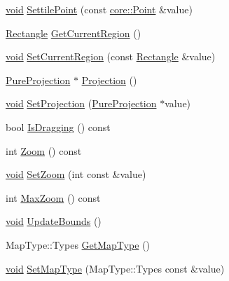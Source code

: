 \begin{DoxyCompactItemize}
\item 
\hyperlink{group___u_a_v_objects_plugin_ga444cf2ff3f0ecbe028adce838d373f5c}{void} \hyperlink{group___o_p_map_widget_ga9d04a0fb020c49a8280b7368f41594a2}{\-Settile\-Point} (const \hyperlink{structcore_1_1_point}{core\-::\-Point} \&value)
\item 
\hyperlink{structinternals_1_1_rectangle}{\-Rectangle} \hyperlink{group___o_p_map_widget_ga00bfe5203c4a1a950f4699bf6fe59293}{\-Get\-Current\-Region} ()
\item 
\hyperlink{group___u_a_v_objects_plugin_ga444cf2ff3f0ecbe028adce838d373f5c}{void} \hyperlink{group___o_p_map_widget_gaddaa2d4fdadeb35b3d6e5c36414ad438}{\-Set\-Current\-Region} (const \hyperlink{structinternals_1_1_rectangle}{\-Rectangle} \&value)
\item 
\hyperlink{classinternals_1_1_pure_projection}{\-Pure\-Projection} $\ast$ \hyperlink{group___o_p_map_widget_ga9c5fee7624bff404ca2529858e9a444a}{\-Projection} ()
\item 
\hyperlink{group___u_a_v_objects_plugin_ga444cf2ff3f0ecbe028adce838d373f5c}{void} \hyperlink{group___o_p_map_widget_gae73f665340d21d819b8309c1d39d44bb}{\-Set\-Projection} (\hyperlink{classinternals_1_1_pure_projection}{\-Pure\-Projection} $\ast$value)
\item 
bool \hyperlink{group___o_p_map_widget_gad8a3ada83240ab83169d589af8486058}{\-Is\-Dragging} () const 
\item 
int \hyperlink{group___o_p_map_widget_ga5cf2de6f702a137c1c43767aad11b160}{\-Zoom} () const 
\item 
\hyperlink{group___u_a_v_objects_plugin_ga444cf2ff3f0ecbe028adce838d373f5c}{void} \hyperlink{group___o_p_map_widget_ga5cdc1bd7abb72b74bb3cf85d3aec9e3d}{\-Set\-Zoom} (int const \&value)
\item 
int \hyperlink{group___o_p_map_widget_ga50e3825136212baafad997c35bf606ef}{\-Max\-Zoom} () const 
\item 
\hyperlink{group___u_a_v_objects_plugin_ga444cf2ff3f0ecbe028adce838d373f5c}{void} \hyperlink{group___o_p_map_widget_gacbeb6f00e71443854ec421841d9bc431}{\-Update\-Bounds} ()
\item 
\-Map\-Type\-::\-Types \hyperlink{group___o_p_map_widget_gad38d6a52a014cb9b52c6df7d47f3e3fe}{\-Get\-Map\-Type} ()
\item 
\hyperlink{group___u_a_v_objects_plugin_ga444cf2ff3f0ecbe028adce838d373f5c}{void} \hyperlink{group___o_p_map_widget_ga5d71e20762c9714191db9f74f3dd3b6a}{\-Set\-Map\-Type} (\-Map\-Type\-::\-Types const \&value)
\item 

\end{DoxyCompactItemize}
